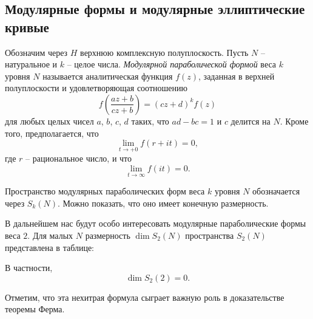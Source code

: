 \begin{multicols}{3}
\subsection*{Модулярные формы и модулярные эллиптические кривые}

Обозначим через $H$ верхнюю комплексную полуплоскость. Пусть $N$ -- натуральное и $k$ -- целое числа. \emph{Модулярной параболической формой} веса $k$ уровня $N$ называется аналитическая функция $f(z)$, заданная в верхней полуплоскости и удовлетворяющая соотношению
\begin{equation}
    \tag{5}
    \label{eq:cond}
    f\left(\frac{az + b}{cz + b}\right) = (cz + d)^kf(z)
\end{equation}
для любых целых чисел $a$, $b$, $c$, $d$ таких, что $ad - bc = 1$ и $c$ делится на $N$. Кроме того, предполагается, что
\begin{equation*}
    \lim_{t\to+0} f(r + it) = 0,
\end{equation*}
где $r$ -- рациональное число, и что
\begin{equation*}
    \lim_{t\to\infty} f(it) = 0.
\end{equation*}

Пространство модулярных параболических форм веса $k$ уровня $N$ обозначается через $S_k(N)$. Можно показать, что оно имеет конечную размерность.

В дальнейшем нас будут особо интересовать модулярные параболические формы веса $2$. Для малых $N$ размерность $\dim S_2(N)$ пространства $S_2(N)$ представлена в таблице:
\begin{center}
\renewcommand{\arraystretch}{2}
\renewcommand{\arraystretch}{1}
\end{center}
В частности,
\begin{equation}
    \tag{6}
    \dim S_2(2) = 0.
\end{equation}

Отметим, что эта нехитрая формула сыграет важную роль в доказательстве теоремы Ферма.


\end{multicols}
